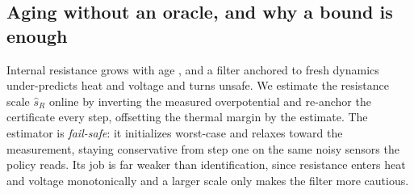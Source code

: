 \documentclass[conference]{IEEEtran}
\begin{document}
\subsection{Aging without an oracle, and why a bound is enough}
\label{sec:method-aging}
Internal resistance grows with age \cite{kirkaldy2024}, and a filter anchored to fresh
dynamics under-predicts heat and voltage and turns unsafe. We estimate the resistance scale $\hat s_R$
online by inverting the measured overpotential \cite{plett2015,waag2014} and re-anchor the certificate
every step, offsetting the thermal margin by the estimate. The estimator is \emph{fail-safe}: it
initializes worst-case and relaxes toward the measurement, staying conservative from step one on the
same noisy sensors the policy reads. Its job is far weaker than identification, since resistance enters
heat and voltage monotonically and a larger scale only makes the filter more cautious.
\end{document}
